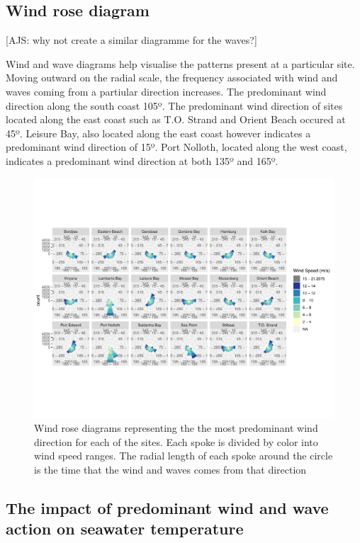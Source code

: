 \documentclass[12pt,a4paper,]{article}
\begin{document}
\hypertarget{wind-rose-diagram}{%
\subsection{Wind rose diagram}\label{wind-rose-diagram}}

{[}AJS: why not create a similar diagramme for the waves?{]}

Wind and wave diagrams help visualise the patterns present at a
particular site. Moving outward on the radial scale, the frequency
associated with wind and waves coming from a partiular direction
increases. The predominant wind direction along the south coast 105º.
The predominant wind direction of sites located along the east coast
such as T.O. Strand and Orient Beach occured at 45º. Leisure Bay, also
located along the east coast however indicates a predominant wind
direction of 15º. Port Nolloth, located along the west coast, indicates
a predominant wind direction at both 135º and 165º.

\begin{figure}
\centering
\includegraphics{../figures/p.wr3.pdf}
\caption{Wind rose diagrams representing the the most predominant wind
direction for each of the sites. Each spoke is divided by color into
wind speed ranges. The radial length of each spoke around the circle is
the time that the wind and waves comes from that direction}
\end{figure}

\hypertarget{the-impact-of-predominant-wind-and-wave-action-on-seawater-temperature}{%
\subsection{The impact of predominant wind and wave action on seawater
temperature}\label{the-impact-of-predominant-wind-and-wave-action-on-seawater-temperature}}
\end{document}
